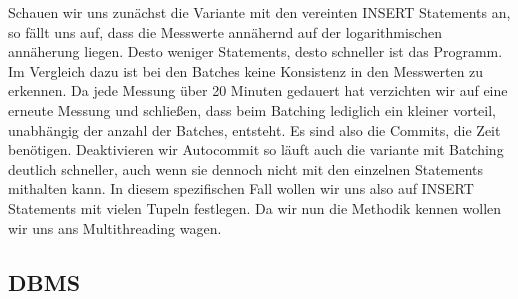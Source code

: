 Schauen wir uns zunächst die Variante mit den vereinten INSERT Statements an, so fällt uns auf, dass die Messwerte annähernd auf der logarithmischen annäherung liegen.
Desto weniger Statements, desto schneller ist das Programm.
Im Vergleich dazu ist bei den Batches keine Konsistenz in den Messwerten zu erkennen.
Da jede Messung über 20 Minuten gedauert hat verzichten wir auf eine erneute Messung und schließen, dass beim Batching lediglich ein kleiner vorteil, unabhängig der anzahl der Batches, entsteht.
Es sind also die Commits, die Zeit benötigen.
Deaktivieren wir Autocommit so läuft auch die variante mit Batching deutlich schneller, auch wenn sie dennoch nicht mit den einzelnen Statements mithalten kann.
In diesem spezifischen Fall wollen wir uns also auf INSERT Statements mit vielen Tupeln festlegen.
Da wir nun die Methodik kennen wollen wir uns ans Multithreading wagen.


\subsection{DBMS}\label{subsec:dbms}